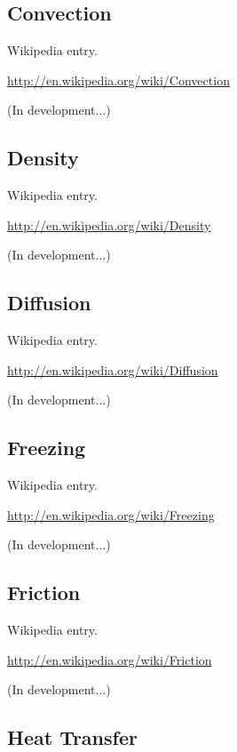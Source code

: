 \documentclass[12pt,oneside]{book}
\begin{document}
\subsection[Convection]{Convection}

Wikipedia entry.

\href{http://en.wikipedia.org/wiki/Convection}{http://en.wikipedia.org/wiki/Convection}

(In development...)

\subsection[Density]{Density}

Wikipedia entry.

\href{http://en.wikipedia.org/wiki/Density}{http://en.wikipedia.org/wiki/Density}

(In development...)

\subsection[Diffusion]{Diffusion}

Wikipedia entry.

\href{http://en.wikipedia.org/wiki/Diffusion}{http://en.wikipedia.org/wiki/Diffusion}

(In development...)

\subsection[Freezing]{Freezing}

Wikipedia entry.

\href{http://en.wikipedia.org/wiki/Freezing}{http://en.wikipedia.org/wiki/Freezing}

(In development...)

\subsection[Friction]{Friction}

Wikipedia entry.

\href{http://en.wikipedia.org/wiki/Friction}{http://en.wikipedia.org/wiki/Friction}

(In development...)

\subsection[Heat Transfer]{Heat Transfer}
\end{document}
